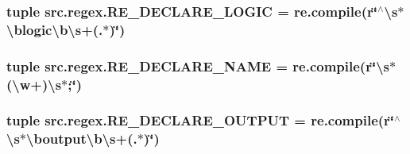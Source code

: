 \hypertarget{namespacesrc_1_1regex_a3673c4dfda97c58d79251bcc52bcbaca}{
\subsubsection[{R\-E\-\_\-\-D\-E\-C\-L\-A\-R\-E\-\_\-\-L\-O\-G\-I\-C}]{\setlength{\rightskip}{0pt plus 5cm}tuple src.\-regex.\-R\-E\-\_\-\-D\-E\-C\-L\-A\-R\-E\-\_\-\-L\-O\-G\-I\-C = re.\-compile(r\char`\"{}$^\wedge$\textbackslash{}s$\ast$\textbackslash{}blogic\textbackslash{}b\textbackslash{}s+(.$\ast$)\char`\"{})}}\label{namespacesrc_1_1regex_a3673c4dfda97c58d79251bcc52bcbaca}
\hypertarget{namespacesrc_1_1regex_a7990130fc037d49b0c6942055c4ae022}{
\subsubsection[{R\-E\-\_\-\-D\-E\-C\-L\-A\-R\-E\-\_\-\-N\-A\-M\-E}]{\setlength{\rightskip}{0pt plus 5cm}tuple src.\-regex.\-R\-E\-\_\-\-D\-E\-C\-L\-A\-R\-E\-\_\-\-N\-A\-M\-E = re.\-compile(r\char`\"{}\textbackslash{}s$\ast$(\textbackslash{}w+)\textbackslash{}s$\ast$;\char`\"{})}}\label{namespacesrc_1_1regex_a7990130fc037d49b0c6942055c4ae022}
\hypertarget{namespacesrc_1_1regex_a6705bef4edaaa358fe4178626517b0f3}{
\subsubsection[{R\-E\-\_\-\-D\-E\-C\-L\-A\-R\-E\-\_\-\-O\-U\-T\-P\-U\-T}]{\setlength{\rightskip}{0pt plus 5cm}tuple src.\-regex.\-R\-E\-\_\-\-D\-E\-C\-L\-A\-R\-E\-\_\-\-O\-U\-T\-P\-U\-T = re.\-compile(r\char`\"{}$^\wedge$\textbackslash{}s$\ast$\textbackslash{}boutput\textbackslash{}b\textbackslash{}s+(.$\ast$)\char`\"{})}}\label{namespacesrc_1_1regex_a6705bef4edaaa358fe4178626517b0f3}
